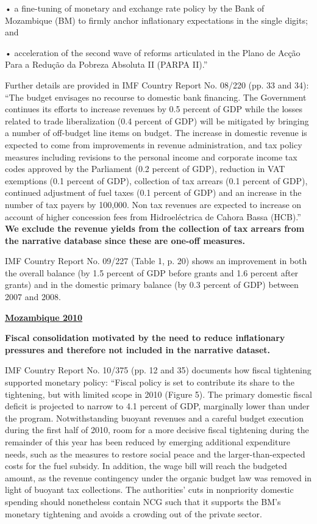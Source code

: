 • a fine-tuning of monetary and exchange rate policy by the Bank of Mozambique (BM) to firmly anchor inflationary expectations in the single digits; and

• acceleration of the second wave of reforms articulated in the Plano de Acção Para a Redução da Pobreza Absoluta II (PARPA II).”

Further details are provided in IMF Country Report No. 08/220 (pp. 33 and 34): “The budget envisages no recourse to domestic bank financing. The Government continues its efforts to increase revenues by 0.5 percent of GDP while the losses related to trade liberalization (0.4 percent of GDP) will be mitigated by bringing a number of off-budget line items on budget. The increase in domestic revenue is expected to come from improvements in revenue administration, and tax policy measures including revisions to the personal income and corporate income tax codes approved by the Parliament (0.2 percent of GDP), reduction in VAT exemptions (0.1 percent of GDP), collection of tax arrears (0.1 percent of GDP), continued adjustment of fuel taxes (0.1 percent of GDP) and an increase in the number of tax payers by 100,000. Non tax revenues are expected to increase on account of higher concession fees from Hidroeléctrica de Cahora Bassa (HCB).” \textbf{We exclude the revenue yields from the collection of tax arrears from the narrative database since these are one-off measures.}

IMF Country Report No. 09/227 (Table 1, p. 20) shows an improvement in both the overall balance (by 1.5 percent of GDP before grants and 1.6 percent after grants) and in the domestic primary balance (by 0.3 percent of GDP) between 2007 and 2008.

\textbf{\underline{Mozambique 2010}}

\textbf{Fiscal consolidation motivated by the need to reduce inflationary pressures and therefore not included in the narrative dataset.}

IMF Country Report No. 10/375 (pp. 12 and 35) documents how fiscal tightening supported monetary policy: “Fiscal policy is set to contribute its share to the tightening, but with limited scope in 2010 (Figure 5). The primary domestic fiscal deficit is projected to narrow to 4.1 percent of GDP, marginally lower than under the program. Notwithstanding buoyant revenues and a careful budget execution during the first half of 2010, room for a more decisive fiscal tightening during the remainder of this year has been reduced by emerging additional expenditure needs, such as the measures to restore social peace and the larger-than-expected costs for the fuel subsidy. In addition, the wage bill will reach the budgeted amount, as the revenue contingency under the organic budget law was removed in light of buoyant tax collections. The authorities’ cuts in nonpriority domestic spending should nonetheless contain NCG such that it supports the BM’s monetary tightening and avoids a crowding out of the private sector.

